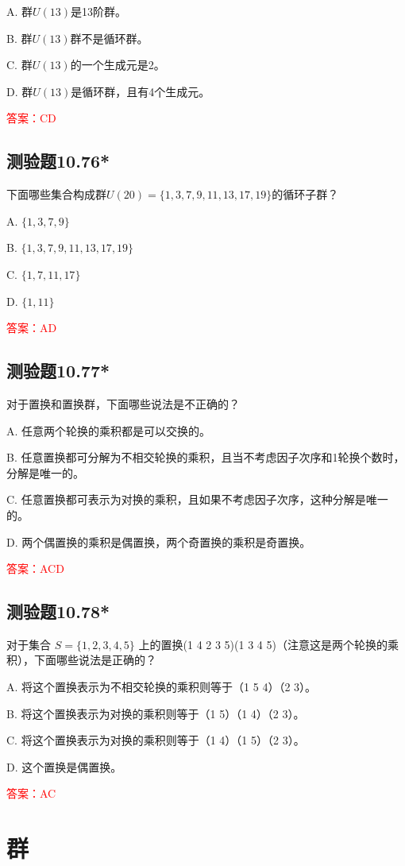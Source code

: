 \documentclass[UTF8, heading=true]{ctexart}
\begin{document}
A. 群$U(13)$是13阶群。

B. 群$U(13)$群不是循环群。

C. 群$U(13)$的一个生成元是2。

D. 群$U(13)$是循环群，且有4个生成元。

\textcolor{red}{答案：CD}

\subsection{测验题10.76*}

下面哪些集合构成群$U(20)=\{1,3,7,9,11,13,17,19\}$的循环子群？

A. $\{1,3,7,9\}$

B. $\{1,3,7,9,11,13,17,19\}$

C. $\{1,7,11,17\}$

D. $\{1,11\}$

\textcolor{red}{答案：AD}

\subsection{测验题10.77*}

对于置换和置换群，下面哪些说法是不正确的？

A. 任意两个轮换的乘积都是可以交换的。

B. 任意置换都可分解为不相交轮换的乘积，且当不考虑因子次序和1轮换个数时，分解是唯一的。

C. 任意置换都可表示为对换的乘积，且如果不考虑因子次序，这种分解是唯一的。

D. 两个偶置换的乘积是偶置换，两个奇置换的乘积是奇置换。

\textcolor{red}{答案：ACD}

\subsection{测验题10.78*}

对于集合 $S=\{1,2,3,4,5\}$ 上的置换(1 4 2 3 5)(1 3 4 5)（注意这是两个轮换的乘积），下面哪些说法是正确的？

A. 将这个置换表示为不相交轮换的乘积则等于（1 5 4）（2 3）。

B. 将这个置换表示为对换的乘积则等于（1 5）（1 4）（2 3）。

C. 将这个置换表示为对换的乘积则等于（1 4）（1 5）（2 3）。

D. 这个置换是偶置换。

\textcolor{red}{答案：AC}


\section{群}
\end{document}
